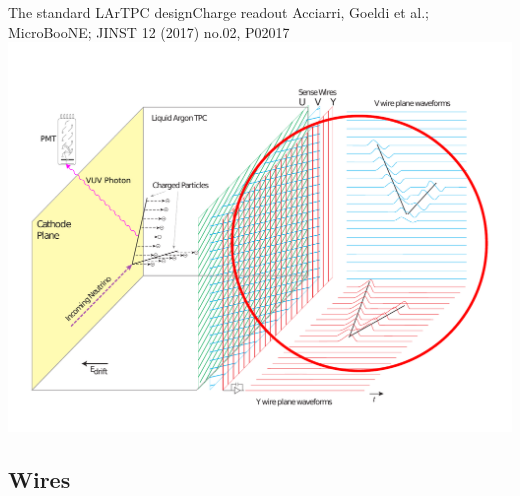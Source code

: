 \documentclass[]{beamer}
\newcommand*{\uboone}{{MicroBooNE}}
\newcommand*{\lartpc}{{LArTPC}}
\begin{document}
\begin{frame}{The standard \lartpc{} design}{Charge readout}
	{\tiny Acciarri, Goeldi et al.; \uboone{}; JINST 12 (2017) no.02, P02017~\cite{uboone}}\\
	\centering
	\includegraphics[viewport=35 40 755 540, clip, height=.75\textheight]{defence/TPCprinciple_charge-ro}\\
\end{frame}

\subsection{Wires}
\end{document}
